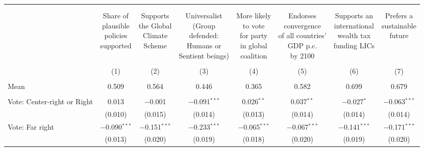 
\begin{tabular}{@{\extracolsep{5pt}}lccccccc} 
\\[-1.8ex]\hline 
\hline \\[-1.8ex] 
\\[-1.8ex] & \makecell{Share of\\plausible\\policies\\supported} & \makecell{Supports\\the Global\\Climate\\Scheme} & \makecell{Universalist\\(Group\\defended:\\Humans or\\Sentient beings)} & \makecell{More likely\\to vote\\for party\\in global\\coalition} & \makecell{Endorses\\convergence\\of all countries'\\GDP p.c.\\by 2100} & \makecell{Supports an\\international\\wealth tax\\funding LICs} & \makecell{Prefers a\\sustainable\\future} \\ 
\\[-1.8ex] & (1) & (2) & (3) & (4) & (5) & (6) & (7)\\ 
\hline \\[-1.8ex] 
Mean & 0.509 & 0.564 & 0.446 & 0.365 & 0.582 & 0.699 & 0.679  \\ \hline \\[-1.8ex]
 Vote: Center\mbox{-}right or Right & 0.013 & $-$0.001 & $-$0.091$^{***}$ & 0.026$^{**}$ & 0.037$^{**}$ & $-$0.027$^{*}$ & $-$0.063$^{***}$ \\ 
  & (0.010) & (0.015) & (0.014) & (0.013) & (0.014) & (0.014) & (0.014) \\ 
  Vote: Far right & $-$0.090$^{***}$ & $-$0.151$^{***}$ & $-$0.233$^{***}$ & $-$0.065$^{***}$ & $-$0.067$^{***}$ & $-$0.141$^{***}$ & $-$0.171$^{***}$ \\ 
  & (0.013) & (0.020) & (0.019) & (0.018) & (0.020) & (0.019) & (0.020) \\ 

\end{tabular}
